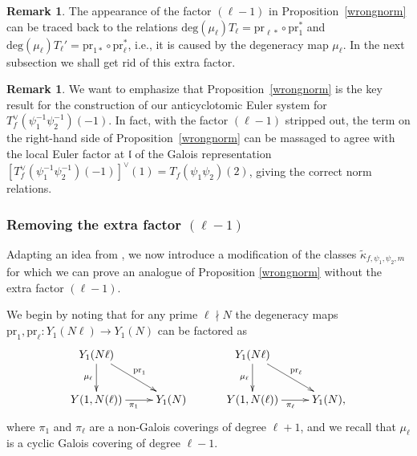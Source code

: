 \documentclass[10pt,letterpaper]{amsart}
\theoremstyle{plain}
\theoremstyle{definition}
\newtheorem{rmk}[thm]{Remark}
\theoremstyle{definition}
\theoremstyle{plain}
\theoremstyle{plain}
\theoremstyle{plain}
\theoremstyle{remark}
\numberwithin{equation}{section}
\newcommand{\fkl}{\mathfrak{l}}
\begin{document}
\begin{rmk}
The appearance of the factor $(\ell-1)$ in Proposition~\ref{wrongnorm} can be traced back to the relations $\text{deg}(\mu_\ell) T_\ell=\text{pr}_{\ell*}\circ \text{pr}_1^{*}$ and $\text{deg}(\mu_\ell)T_\ell'=\text{pr}_{1*}\circ\text{pr}_\ell^{*}$, 
i.e., it is caused by the degeneracy map $\mu_\ell$.  In the next subsection we shall get rid of this extra factor.
\end{rmk}

\begin{rmk} We want to emphasize that Proposition~\ref{wrongnorm} is the key result for the construction of our anticyclotomic Euler system for $T_f^\vee(\psi_1^{-1}\psi_2^{-1})(-1)$.
In fact, with the factor $(\ell-1)$ stripped out, the term on the right-hand side of Proposition~\ref{wrongnorm} can be massaged to agree with the local Euler factor at $\fkl$ of the Galois representation $[T_f^\vee(\psi_1^{-1}\psi_2^{-1})(-1)]^\vee(1)=T_f(\psi_1\psi_2)(2)$, giving the correct norm relations. 
\end{rmk}

\subsubsection{Removing the extra factor $(\ell-1)$}\label{thefix} 

Adapting an idea from \cite[$\S{1.4}$]{DR2}, we now introduce a modification of the classes $\tilde{\kappa}_{f,\psi_1,\psi_2,m}$ for which we can prove an analogue of Proposition \ref{wrongnorm} without the extra factor $(\ell-1)$. 

We begin by noting that for any prime $\ell\nmid N$ the degeneracy maps ${\mathrm{pr}}_1,{\mathrm{pr}}_\ell:Y_1(N\ell)\rightarrow Y_1(N)$ can be factored as
\[
\xymatrix{
Y_1(N\ell) \ar[dr]^{\text{pr}_1} \ar[d]_{\mu_\ell}  \\
Y(1,N(\ell))\ar[r]_{\pi_1} & Y_1(N) } \quad\quad\quad
\xymatrix{
Y_1(N\ell) \ar[dr]^{\text{pr}_\ell} \ar[d]_{\mu_\ell}  \\
Y(1,N(\ell))\ar[r]_{\pi_\ell} & Y_1(N), }
\]
where 
$\pi_1$ and $\pi_\ell$ are a non-Galois coverings of degree $\ell+1$, and we recall that $\mu_\ell$ is a cyclic Galois covering of degree $\ell-1$.
\end{document}
